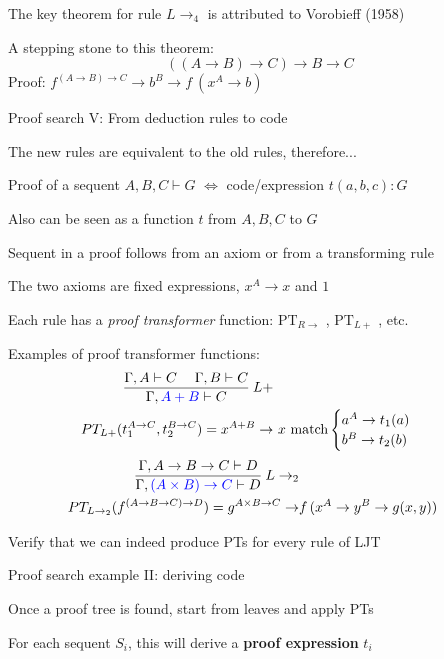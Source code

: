 The key theorem for rule $L\rightarrow_{4}$ is attributed to Vorobieff
(1958)

A stepping stone to this theorem:{\footnotesize{}
\[
\left(\left(A\rightarrow B\right)\rightarrow C\right)\rightarrow B\rightarrow C
\]
}Proof: $f^{\left(A\rightarrow B\right)\rightarrow C}\rightarrow b^{B}\rightarrow f\:(x^{A}\rightarrow b)$

Proof search V: From deduction rules to code

The new rules are equivalent to the old rules, therefore...

Proof of a sequent $A,B,C\vdash G$ $\Leftrightarrow$ code/expression
$t(a,b,c):G$

Also can be seen as a function $t$ from $A,B,C$ to $G$

Sequent in a proof follows from an axiom or from a transforming rule

The two axioms are fixed expressions, $x^{A}\rightarrow x$ and $1$

Each rule has a \emph{proof transformer} function: $\text{PT}_{R\rightarrow}$
, $\text{PT}_{L+}$ , etc.

Examples of proof transformer functions:
\begin{align*}
\frac{\Gamma,A\vdash C\quad\;\Gamma,B\vdash C}{\Gamma,{\color{blue}A+B}\vdash C}\:L+\\
PT_{L+}(t_{1}^{A\rightarrow C},t_{2}^{B\rightarrow C})=x^{A+B}\rightarrow & \ x\ \text{match}\begin{cases}
a^{A}\rightarrow t_{1}(a)\\
b^{B}\rightarrow t_{2}(b)
\end{cases}
\end{align*}
\begin{align*}
\frac{\Gamma,A\rightarrow B\rightarrow C\vdash D}{\Gamma,{\color{blue}(A\times B)\rightarrow C}\vdash D}\:L\rightarrow_{2}\\
PT_{L\rightarrow_{2}}(f^{\left(A\rightarrow B\rightarrow C\right)\rightarrow D})=g^{A\times B\rightarrow C}\rightarrow & f\,(x^{A}\rightarrow y^{B}\rightarrow g(x,y))
\end{align*}

Verify that we can indeed produce PTs for every rule of LJT

Proof search example II: deriving code

Once a proof tree is found, start from leaves and apply PTs

For each sequent $S_{i}$, this will derive a \textbf{proof expression}
$t_{i}$

